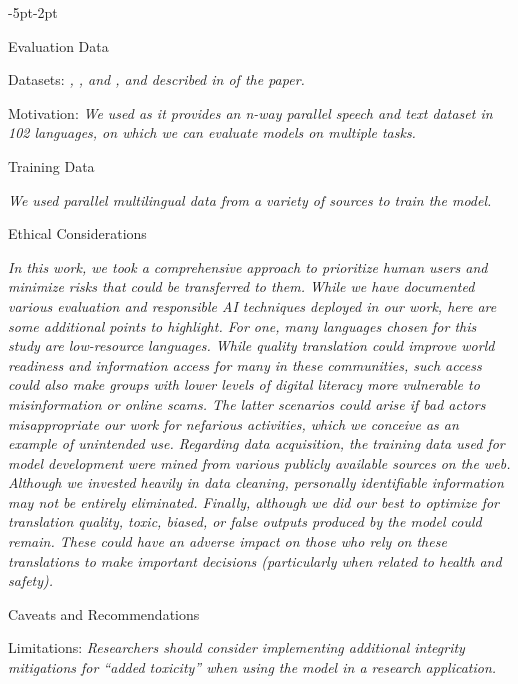 \begin{adjustwidth}{-5pt}{-2pt}
\begin{singlespace}
\begin{tcolorbox}[title=\textbf{\section{Model Card - \mfourt}},
    breakable, sharp corners, boxrule=0.5pt]
\begin{mcsection}{Evaluation Data}
    \item Datasets: \textit{\fleurs, \flores, \covost and \cvss, \holisticbias and \multilingualholisticbias described in  of the \mfourt paper.
    }
\item Motivation: \textit{We used \fleurs as it provides
an n-way parallel speech and text dataset in 102 languages, on which we can evaluate \mfourt models on multiple tasks.}

\end{mcsection}

\begin{mcsection}{Training Data}
\item \textit{We used parallel multilingual data from a variety of sources to train the model. %
}
\end{mcsection}



\begin{mcsection}{Ethical Considerations}
 \item \textit{In this work, we took a comprehensive approach to prioritize human users and minimize risks that could be transferred to them. While we have documented various evaluation and responsible AI techniques deployed in our work, here are some additional points to highlight. For one, many languages chosen for this study are low-resource languages.
 While quality translation could improve world readiness and information access for many in these communities, such access could also make groups with lower levels of digital literacy more vulnerable to misinformation or online scams. The latter scenarios could arise if bad actors misappropriate our work for nefarious activities, which we conceive as an example of unintended use.
 Regarding data acquisition, the training data used for model development were mined from various publicly available sources on the web. Although we invested heavily in data cleaning, personally identifiable information may not be entirely eliminated. 
 Finally, although we did our best to optimize for translation quality, toxic, biased, or false outputs produced by the model could remain. These could have an adverse impact on those who rely on these translations to make important decisions (particularly when related to health and safety).} 
\end{mcsection}


\begin{mcsection}{Caveats and Recommendations}
  \item Limitations: \textit{Researchers should consider implementing additional integrity mitigations for ``added toxicity'' when using the model in a research application.}
\end{mcsection}


\end{tcolorbox}
\end{singlespace}
\end{adjustwidth}
\newpage
